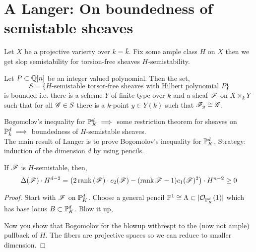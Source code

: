 \documentclass[12pt]{article}
\begin{document}
\section{A Langer: On boundedness of semistable sheaves}

Let $X$ be a projective varierty over $k = \bar{k}$. Fix some ample class $H$ on $X$ then we get slop semistability for torsion-free sheaves $H$-semistability.

\begin{theorem}[Boundedness]
Let $P \subset \Q[n]$ be an integer valued polynomial. Then the set,
\[ S = \{ H\text{-semistable torsor-free sheaves with Hilbert polynomial } P \} \]
is bounded i.e. there is a scheme $Y$ of finite type over $k$ and a sheaf $\F$ on $X \times_k Y$ such that for all $\G \in S$ there is a $k$-point $y \in Y(k)$ such that $\F_y \cong \G$. 
\end{theorem}

Bogomolov's inequality for $\P^d_K \implies$ some restriction theorem for sheaves on $\P^d_k \implies$ boundedness of $H$-semistable sheaves. 
\bigskip\\
The main result of Langer is to prove Bogomolov's inequality for $\P^d_K$. Strategy: induction of the dimension $d$ by using pencils. 

\begin{theorem}
If $\F$ is $H$-semistable, then,
\[ \Delta(\F) \cdot H^{d-2} = \left(2 \rank{(\F)} \cdot c_2(\F) - (\rank{\F} - 1) c_1(\F)^2 \right) \cdot H^{n-2} \ge 0 \] 
\end{theorem}

\begin{proof}
Start with $\F$ on $\P^d_K$. Choose a general pencil $\P^1 \cong \Lambda \subset |\struct{\P^d_K}(1)|$ which has base locus $B \subset \P^d_K$. Blow it up,
\begin{center}
\end{center}
Now you show that Bogomolov for the blowup withrespt to the (now not ample) pullback of $H$. The fibers are projective spaces so we can reduce to smaller dimension. 
\end{proof}
\end{document}
